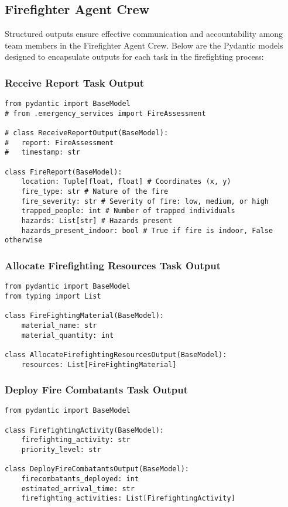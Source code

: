 \subsection{Firefighter Agent Crew}

Structured outputs ensure effective communication and accountability among team members in the Firefighter Agent Crew. Below are the Pydantic models designed to encapsulate outputs for each task in the firefighting process:

\subsubsection{Receive Report Task Output}
\begin{lstlisting}[caption={Pydantic model for Receive Report Task Output}]
from pydantic import BaseModel
# from .emergency_services import FireAssessment

# class ReceiveReportOutput(BaseModel):
#   report: FireAssessment
#   timestamp: str

class FireReport(BaseModel):
    location: Tuple[float, float] # Coordinates (x, y)
    fire_type: str # Nature of the fire 
    fire_severity: str # Severity of fire: low, medium, or high
    trapped_people: int # Number of trapped individuals
    hazards: List[str] # Hazards present
    hazards_present_indoor: bool # True if fire is indoor, False otherwise
\end{lstlisting}


\subsubsection{Allocate Firefighting Resources Task Output}
\begin{lstlisting}[caption={Pydantic model for Allocate Firefighting Resources Task Output}]
from pydantic import BaseModel
from typing import List

class FireFightingMaterial(BaseModel):
    material_name: str
    material_quantity: int

class AllocateFirefightingResourcesOutput(BaseModel):
    resources: List[FireFightingMaterial]
\end{lstlisting}


\subsubsection{Deploy Fire Combatants Task Output}
\begin{lstlisting}[caption={Pydantic model for Deploy Fire Combatants Task Output}]
from pydantic import BaseModel

class FirefightingActivity(BaseModel):
    firefighting_activity: str
    priority_level: str

class DeployFireCombatantsOutput(BaseModel):
    firecombatants_deployed: int
    estimated_arrival_time: str
    firefighting_activities: List[FirefightingActivity]
\end{lstlisting}


